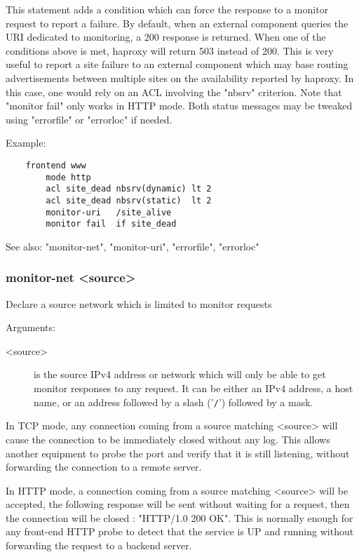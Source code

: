   This statement adds a condition which can force the response to a monitor
  request to report a failure. By default, when an external component queries
  the URI dedicated to monitoring, a 200 response is returned. When one of the
  conditions above is met, haproxy will return 503 instead of 200. This is
  very useful to report a site failure to an external component which may base
  routing advertisements between multiple sites on the availability reported by
  haproxy. In this case, one would rely on an ACL involving the "nbsrv"
  criterion. Note that "monitor fail" only works in HTTP mode. Both status
  messages may be tweaked using "errorfile" or "errorloc" if needed.

  Example:
 \begin{verbatim}
    frontend www
        mode http
        acl site_dead nbsrv(dynamic) lt 2
        acl site_dead nbsrv(static)  lt 2
        monitor-uri   /site_alive
        monitor fail  if site_dead
\end{verbatim}

  See also: "monitor-net", "monitor-uri", "errorfile", "errorloc"

\subsubsection[monitor-net]{monitor-net <source>}
  Declare a source network which is limited to monitor requests


  Arguments:
\begin{description}
\item[ <source>]  is the source IPv4 address or network which will only be able to
              get monitor responses to any request. It can be either an IPv4
              address, a host name, or an address followed by a slash ('\verb|/|')
              followed by a mask.
\end{description}

  In TCP mode, any connection coming from a source matching <source> will cause
  the connection to be immediately closed without any log. This allows another
  equipment to probe the port and verify that it is still listening, without
  forwarding the connection to a remote server.

  In HTTP mode, a connection coming from a source matching <source> will be
  accepted, the following response will be sent without waiting for a request,
  then the connection will be closed : "HTTP/1.0 200 OK". This is normally
  enough for any front-end HTTP probe to detect that the service is UP and
  running without forwarding the request to a backend server.

